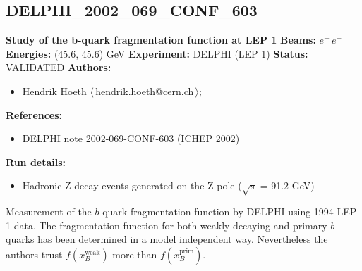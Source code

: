 \clearpage

\subsection{DELPHI\_2002\_069\_CONF\_603}
\textbf{Study of the b-quark fragmentation function at LEP 1}\newline
\textbf{Beams:} $e^-$\,$e^+$ \newline
\textbf{Energies:} (45.6, 45.6) GeV \newline
\textbf{Experiment:} DELPHI (LEP 1) \newline
\textbf{Status:} VALIDATED\newline
\textbf{Authors:}
\begin{itemize}
  \item Hendrik Hoeth $\langle\,$\href{mailto:hendrik.hoeth@cern.ch}{hendrik.hoeth@cern.ch}$\,\rangle$;
\end{itemize}
\textbf{References:}
\begin{itemize}
  \item DELPHI note 2002-069-CONF-603 (ICHEP 2002)
\end{itemize}
\textbf{Run details:}
\begin{itemize}

  \item Hadronic Z decay events generated on the Z pole (\ensuremath{\sqrt{s}} = 91.2 GeV)\end{itemize}

\noindent Measurement of the $b$-quark fragmentation function by DELPHI using 1994 LEP 1 data. The fragmentation function for both weakly decaying and primary $b$-quarks has been determined in a model independent way. Nevertheless the authors trust $f(x_B^\text{weak})$ more than $f(x_B^\text{prim})$.

\clearpage


\clearpage

